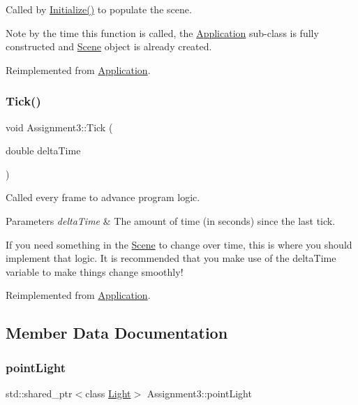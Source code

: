 Called by \hyperlink{class_application_a17cf1ea4552d26a1c20f7d98d793d41d}{Initialize()} to populate the scene.

Note by the time this function is called, the \hyperlink{class_application}{Application} sub-\/class is fully constructed and \hyperlink{class_scene}{Scene} object is already created.

Reimplemented from \hyperlink{class_application_aa8e8017ef8dd86293c96d0645e66d440}{Application}.

\hypertarget{class_assignment3_a11256b6e7b38ab24baa92729cfb8ffe2}{}\label{class_assignment3_a11256b6e7b38ab24baa92729cfb8ffe2}
\subsubsection{\texorpdfstring{Tick()}{Tick()}}
{\footnotesize\ttfamily void Assignment3\+::\+Tick (\begin{DoxyParamCaption}\item[{double}]{delta\+Time }\end{DoxyParamCaption})\hspace{0.3cm}{\ttfamily [virtual]}}



Called every frame to advance program logic.


\begin{DoxyParams}{Parameters}
{\em delta\+Time} & The amount of time (in seconds) since the last tick.\\
\hline
\end{DoxyParams}
If you need something in the \hyperlink{class_scene}{Scene} to change over time, this is where you should implement that logic. It is recommended that you make use of the delta\+Time variable to make things change smoothly!

Reimplemented from \hyperlink{class_application_a0800afd5651153d31fa775a8048d14dd}{Application}.



\subsection{Member Data Documentation}
\hypertarget{class_assignment3_ad1cf5a76d62b5a1ed17e66c31e0feb98}{}\label{class_assignment3_ad1cf5a76d62b5a1ed17e66c31e0feb98}
\subsubsection{\texorpdfstring{point\+Light}{pointLight}}
{\footnotesize\ttfamily std\+::shared\+\_\+ptr$<$class \hyperlink{class_light}{Light}$>$ Assignment3\+::point\+Light\hspace{0.3cm}{\ttfamily [private]}}

